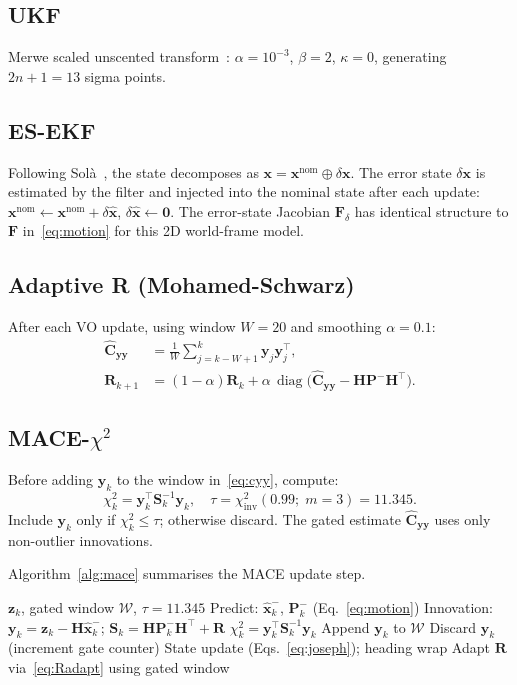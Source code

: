 \documentclass[letterpaper, 10pt, journal]{IEEEtran}
\newcommand{\bmx}{\bm{x}}
\newcommand{\bmP}{\bm{P}}
\newcommand{\bmF}{\bm{F}}
\newcommand{\bmH}{\bm{H}}
\newcommand{\bmR}{\bm{R}}
\newcommand{\bmS}{\bm{S}}
\newcommand{\bmy}{\bm{y}}
\newcommand{\bmz}{\bm{z}}
\newcommand{\xhat}{\hat{\bmx}}
\newcommand{\Pm}{\bmP^{-}}
\newcommand{\xm}{\xhat^{-}}
\DeclareMathOperator{\diag}{diag}
\begin{document}
\subsection{UKF}
Merwe scaled unscented transform~\cite{wan2000ukf}:
$\alpha=10^{-3}$, $\beta=2$, $\kappa=0$, generating $2n+1=13$ sigma points.

\subsection{ES-EKF}
Following Sol\`{a}~\cite{sola2017quaternion}, the state decomposes as
$\bmx = \bmx^{\mathrm{nom}} \oplus \delta\bmx$.
The error state $\delta\bmx$ is estimated by the filter and injected
into the nominal state after each update: $\bmx^{\mathrm{nom}} \leftarrow
\bmx^{\mathrm{nom}} + \delta\hat{\bmx}$, $\delta\hat{\bmx} \leftarrow \bm{0}$.
The error-state Jacobian $\bmF_\delta$ has identical structure to $\bmF$
in~\eqref{eq:motion} for this 2D world-frame model.

\subsection{Adaptive R (Mohamed-Schwarz)}
After each VO update, using window $W=20$ and smoothing $\alpha=0.1$:
\begin{align}
  \hat{\bm{C}}_{\bmy\bmy} &= \tfrac{1}{W}\textstyle\sum_{j=k-W+1}^{k}
    \bmy_j\bmy_j^\top, \label{eq:cyy}\\
  \bmR_{k+1} &= (1{-}\alpha)\bmR_k
    + \alpha\,\diag\!\bigl(\hat{\bm{C}}_{\bmy\bmy} - \bmH\Pm\bmH^\top\bigr).
  \label{eq:Radapt}
\end{align}

\subsection{MACE-$\chi^2$}
Before adding $\bmy_k$ to the window in~\eqref{eq:cyy}, compute:
\begin{equation}
  \chi^2_k = \bmy_k^\top \bmS_k^{-1} \bmy_k,
  \quad \tau = \chi^2_{\mathrm{inv}}(0.99;\; m{=}3) = 11.345.
  \label{eq:gate}
\end{equation}
Include $\bmy_k$ only if $\chi^2_k \leq \tau$; otherwise discard.
The gated estimate $\hat{\bm{C}}_{\bmy\bmy}$ uses only non-outlier innovations.

Algorithm~\ref{alg:mace} summarises the MACE update step.

\begin{algorithm}[t]
\caption{MACE-$\chi^2$ Update Step}
\label{alg:mace}
\begin{algorithmic}[1]
\REQUIRE $\bmz_k$, gated window $\mathcal{W}$, $\tau=11.345$
\STATE Predict: $\xm_k$, $\Pm_k$ (Eq.~\eqref{eq:motion})
\STATE Innovation: $\bmy_k = \bmz_k - \bmH\xm_k$;\;\;
  $\bmS_k = \bmH\Pm_k\bmH^\top + \bmR$
\STATE $\chi^2_k = \bmy_k^\top\bmS_k^{-1}\bmy_k$
  \STATE Append $\bmy_k$ to $\mathcal{W}$
\ELSE
  \STATE Discard $\bmy_k$ (increment gate counter)
\ENDIF
\STATE State update (Eqs.~\eqref{eq:joseph}); heading wrap
  \STATE Adapt $\bmR$ via~\eqref{eq:Radapt} using gated window
\ENDIF
\end{algorithmic}
\end{algorithm}
\end{document}
